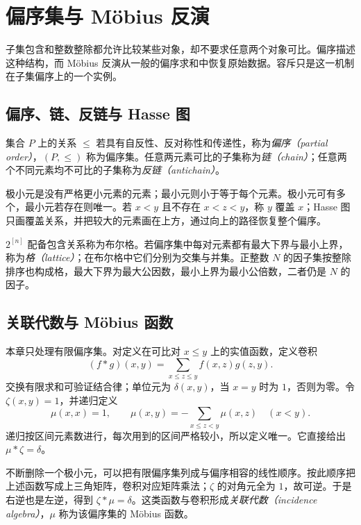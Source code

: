 \setcounter{chapter}{12} %
\chapter{偏序集与 M\"obius 反演}
\label{ch:posets}

子集包含和整数整除都允许比较某些对象，却不要求任意两个对象可比。偏序描述这种结构，而 M\"obius 反演从一般的偏序求和中恢复原始数据。容斥只是这一机制在子集偏序上的一个实例。

\section{偏序、链、反链与 Hasse 图}

\begin{definition}
集合 $P$ 上的关系 $\le$ 若具有自反性、反对称性和传递性，称为\emph{偏序（partial order）}，$(P,\le)$ 称为偏序集。任意两元素可比的子集称为\emph{链（chain）}；任意两个不同元素均不可比的子集称为\emph{反链（antichain）}。
\end{definition}

极小元是没有严格更小元素的元素；最小元则小于等于每个元素。极小元可有多个，最小元若存在则唯一。若 $x<y$ 且不存在 $x<z<y$，称 $y$ 覆盖 $x$；Hasse 图只画覆盖关系，并把较大的元素画在上方，通过向上的路径恢复整个偏序。

$2^{[n]}$ 配备包含关系称为布尔格。若偏序集中每对元素都有最大下界与最小上界，称为\emph{格（lattice）}；在布尔格中它们分别为交集与并集。正整数 $N$ 的因子集按整除排序也构成格，最大下界为最大公因数，最小上界为最小公倍数，二者仍是 $N$ 的因子。

\section{关联代数与 M\"obius 函数}

本章只处理有限偏序集。对定义在可比对 $x\le y$ 上的实值函数，定义卷积
\[
 (f*g)(x,y)=\sum_{x\le z\le y}f(x,z)g(z,y).
\]
交换有限求和可验证结合律；单位元为 $\delta(x,y)$，当 $x=y$ 时为 $1$，否则为零。令 $\zeta(x,y)=1$，并递归定义
\[
 \mu(x,x)=1,\qquad
 \mu(x,y)=-\sum_{x\le z<y}\mu(x,z)\quad(x<y).
\]
递归按区间元素数进行，每次用到的区间严格较小，所以定义唯一。它直接给出 $\mu*\zeta=\delta$。

不断删除一个极小元，可以把有限偏序集列成与偏序相容的线性顺序。按此顺序把上述函数写成上三角矩阵，卷积对应矩阵乘法；$\zeta$ 的对角元全为 $1$，故可逆。于是右逆也是左逆，得到 $\zeta*\mu=\delta$。这类函数与卷积形成\emph{关联代数（incidence algebra）}，$\mu$ 称为该偏序集的 M\"obius 函数。

